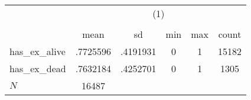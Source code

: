 \begin{table}[htbp]\centering
\def\sym#1{\ifmmode^{#1}\else\(^{#1}\)\fi}
\caption{}
\begin{tabular}{l*{1}{ccccc}}
\hline\hline
            &\multicolumn{5}{c}{(1)}                                         \\
            &\multicolumn{5}{c}{}                                            \\
            &        mean&          sd&         min&         max&       count\\
\hline
has\_ex\_alive&    .7725596&    .4191931&           0&           1&       15182\\
has\_ex\_dead &    .7632184&    .4252701&           0&           1&        1305\\
\hline
\(N\)       &       16487&            &            &            &            \\
\hline\hline
\end{tabular}
\end{table}
